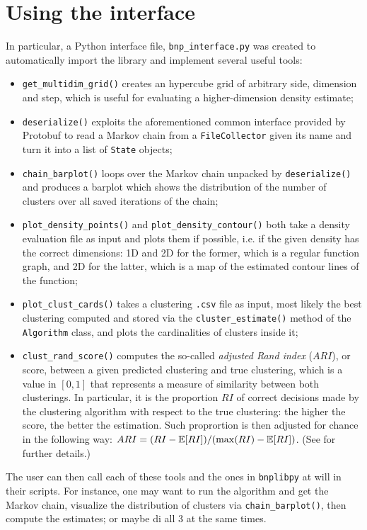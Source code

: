 \section{Using the interface}
In particular, a Python interface file, \verb|bnp_interface.py| was created to automatically import the library and implement several useful tools:
\begin{itemize}
	\item \verb|get_multidim_grid()| creates an hypercube grid of arbitrary side, dimension and step, which is useful for evaluating a higher-dimension density estimate;
	\item \verb|deserialize()| exploits the aforementioned common interface provided by Protobuf to read a Markov chain from a \verb|FileCollector| given its name and turn it into a list of \verb|State| objects;
	\item \verb|chain_barplot()| loops over the Markov chain unpacked by \verb|deserialize()| and produces a barplot which shows the distribution of the number of clusters over all saved iterations of the chain;
	\item \verb|plot_density_points()| and \verb|plot_density_contour()| both take a density evaluation file as input and plots them if possible, i.e. if the given density has the correct dimensions: 1D and 2D for the former, which is a regular function graph, and 2D for the latter, which is a map of the estimated contour lines of the function;
	\item \verb|plot_clust_cards()| takes a clustering \verb|.csv| file as input, most likely the best clustering computed and stored via the \verb|cluster_estimate()| method of the \verb|Algorithm| class, and plots the cardinalities of clusters inside it;
	\item \verb|clust_rand_score()| computes the so-called \emph{adjusted Rand index} ($ARI$), or score, between a given predicted clustering and true clustering, which is a value in $[0,1]$ that represents a measure of similarity between both clusterings.
	In particular, it is the proportion $RI$ of correct decisions made by the clustering algorithm with respect to the true clustering: the higher the score, the better the estimation.
	Such proprortion is then adjusted for chance in the following way:
	$ARI = (RI - \mathbb E[RI]) / (\max(RI) - \mathbb E[RI])$.
	(See \cite{rand} for further details.)
\end{itemize}
The user can then call each of these tools and the ones in \verb|bnplibpy| at will in their scripts.
For instance, one may want to run the algorithm and get the Markov chain, visualize the distribution of clusters via \verb|chain_barplot()|, then compute the estimates; or maybe di all 3 at the same times.
